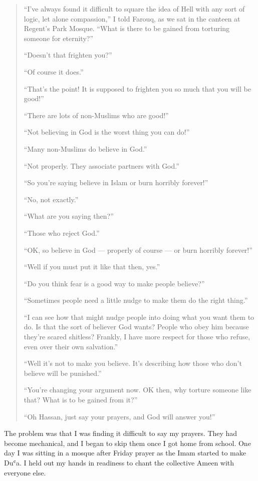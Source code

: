 \documentclass[12pt]{memoir}
\def\`{ʿ} %
\newcommand{\cor}[2]{#2} %
\begin{document}
\begin{quote}
“I’ve always found it difficult to square
the idea of Hell with any sort of logic, let alone compassion,”
I told Farouq, as we sat in the canteen at Regent’s Park Mosque.
“What is there to be gained from torturing someone for eternity?”

“Doesn’t that frighten you?”

“Of course it does.”

“That’s the point!
It is supposed to frighten you so much that you will be good!”

“There are lots of non-Muslims who are good!”

“Not believing in God is the worst thing you can do!”

“Many non-Muslims do believe in God.”

“Not properly.
They associate partners with God.”

“So you’re saying believe in Islam or burn horribly forever!”

“No, not exactly.”

“What are you saying then?”

“Those who reject God.”

“OK, so believe in God — properly of course — or burn horribly forever!”

“Well if you must put it like that then, yes.”

“Do you think fear is a good way to make people believe?”

“Sometimes people need a little nudge to make them do the right thing.”

“I can see how that might nudge people into doing what you want them to do.
Is \cor{that sort}{that the sort} of believer God wants?
People who obey him because they’re scared shitless?
Frankly, I have more respect for those who refuse,
even over their own salvation.”

“Well it’s not to make you believe.
It’s describing how those who don’t believe will be punished.”

“You’re changing your argument now.
OK then, why torture someone like that? What is to be gained from it?”

“Oh Hassan, just say your prayers, and God will answer you!”
\end{quote}

The problem was that I was finding it difficult to say my prayers.
They had become mechanical,
and I began to skip them once I got home from school.
One day I was sitting in a mosque after Friday prayer
as the Imam started to make Du\`a.
I held out my hands in readiness
to chant the collective Ameen with everyone else.
\end{document}
